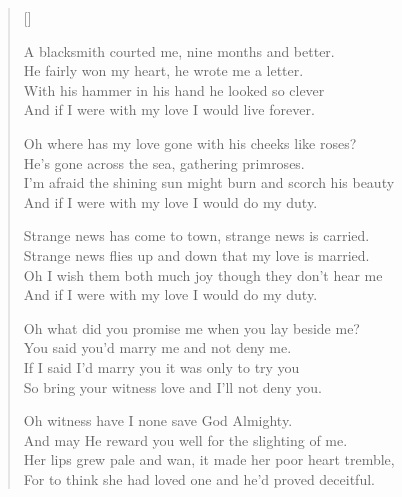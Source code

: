 \pagebreak
\settowidth{\versewidth}{Oh where has my love gone with his cheeks like roses}
\begin{verse}[\versewidth]

A blacksmith courted me, nine months and better.\\
He fairly won my heart, he wrote me a letter.\\
With his hammer in his hand he looked so clever\\
And if I were with my love I would live forever.

Oh where has my love gone with his cheeks like roses?\\
He's gone across the sea, gathering primroses.\\
I'm afraid the shining sun might burn and scorch his beauty\\
And if I were with my love I would do my duty.

Strange news has come to town, strange news is carried.\\
Strange news flies up and down that my love is married.\\
Oh I wish them both much joy though they don't hear me\\
And if I were with my love I would do my duty.

Oh what did you promise me when you lay beside me?\\
You said you'd marry me and not deny me.\\
If I said I'd marry you it was only to try you\\
So bring your witness love and I'll not deny you.

Oh witness have I none save God Almighty.\\
And may He reward you well for the slighting of me.\\
Her lips grew pale and wan, it made her poor heart tremble,\\
For to think she had loved one and he'd proved deceitful.

\end{verse}
